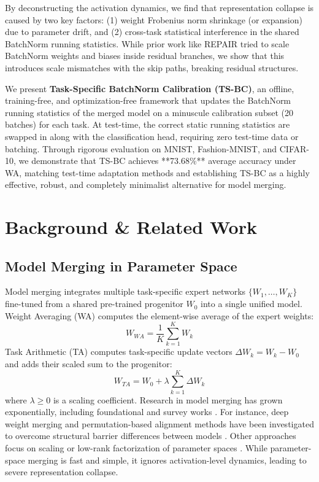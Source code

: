 \documentclass{article}
\theoremstyle{plain}
\theoremstyle{definition}
\theoremstyle{remark}
\begin{document}
By deconstructing the activation dynamics, we find that representation collapse is caused by two key factors: (1) weight Frobenius norm shrinkage (or expansion) due to parameter drift, and (2) cross-task statistical interference in the shared BatchNorm running statistics. While prior work like REPAIR tried to scale BatchNorm weights and biases inside residual branches, we show that this introduces scale mismatches with the skip paths, breaking residual structures.

We present \textbf{Task-Specific BatchNorm Calibration (TS-BC)}, an offline, training-free, and optimization-free framework that updates the BatchNorm running statistics of the merged model on a minuscule calibration subset (20 batches) for each task. At test-time, the correct static running statistics are swapped in along with the classification head, requiring zero test-time data or batching. Through rigorous evaluation on MNIST, Fashion-MNIST, and CIFAR-10, we demonstrate that TS-BC achieves **73.68\%** average accuracy under WA, matching test-time adaptation methods and establishing TS-BC as a highly effective, robust, and completely minimalist alternative for model merging.

\section{Background \& Related Work}
\subsection{Model Merging in Parameter Space}
Model merging integrates multiple task-specific expert networks $\{W_1, \dots, W_K\}$ fine-tuned from a shared pre-trained progenitor $W_0$ into a single unified model. Weight Averaging (WA) computes the element-wise average of the expert weights:
\begin{equation}
W_{WA} = \frac{1}{K} \sum_{k=1}^K W_k
\end{equation}
Task Arithmetic (TA) computes task-specific update vectors $\Delta W_k = W_k - W_0$ and adds their scaled sum to the progenitor:
\begin{equation}
W_{TA} = W_0 + \lambda \sum_{k=1}^K \Delta W_k
\end{equation}
where $\lambda \ge 0$ is a scaling coefficient. Research in model merging has grown exponentially, including foundational and survey works \cite{wortsman2022model, tang2023merging, ilharco2022editing}. For instance, deep weight merging and permutation-based alignment methods have been investigated to overcome structural barrier differences between models \cite{nakaikasai2022deep, chen2024deep, suzuki2022model, dansereau2023model, lv2023deepmerge, slimi2024combinatorial}. Other approaches focus on scaling or low-rank factorization of parameter spaces \cite{saadati2024dimat, ladwig2023modular, shin2020sqwa, shen2023short, moralesbrotons2024exponential, lv2025the, lv2025deep, maron2022model, amine2019merging}. While parameter-space merging is fast and simple, it ignores activation-level dynamics, leading to severe representation collapse.
\end{document}

